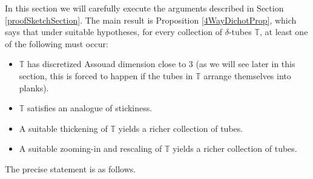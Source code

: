 \documentclass[letterpaper, reqno,11pt]{article}
\numberwithin{equation}{section}
\newcommand{\tubes}{\mathbb{T}}
\numberwithin{thm}{section}
\theoremstyle{remark}
\begin{document}
In this section we will carefully execute the arguments described in Section \ref{proofSketchSection}. The main result is Proposition \ref{4WayDichotProp}, which says that under suitable hypotheses, for every collection of $\delta$-tubes $\tubes$, at least one of the following must occur: 
\begin{itemize}
	\item[(A)] $\tubes$ has discretized Assouad dimension close to 3 (as we will see later in this section, this is forced to happen if the tubes in $\tubes$ arrange themselves into planks).
	\item[(B)] $\tubes$ satisfies an analogue of stickiness.
	\item [(C)] A suitable thickening of $\tubes$ yields a richer collection of tubes.
	\item[(D)] A suitable zooming-in and rescaling of $\tubes$ yields a richer collection of tubes. 
\end{itemize}
The precise statement is as follows.
\end{document}
